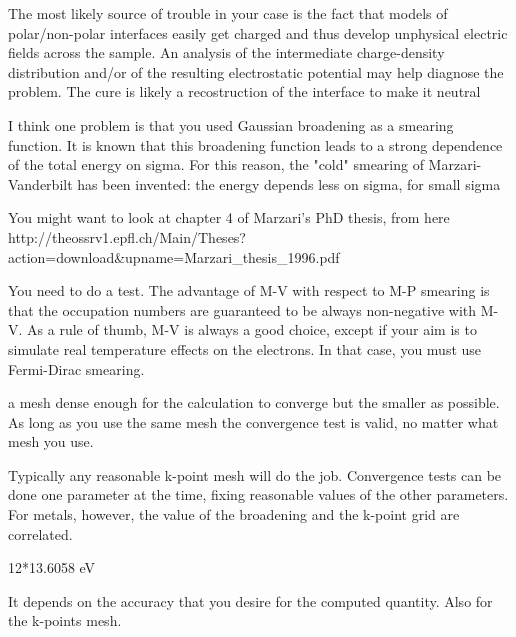   The most likely source of trouble in your case is the fact that models of polar/non-polar interfaces easily get charged and thus develop unphysical electric fields across the sample. An analysis of the intermediate charge-density distribution and/or of the resulting electrostatic potential may help  diagnose the problem. The cure is likely a recostruction of the interface to make it neutral

  I think one problem is that you used Gaussian broadening as a smearing function. It is known that this broadening function leads to a strong dependence of the total energy on sigma. For this reason, the "cold" smearing of Marzari-Vanderbilt has been invented: the energy depends less on sigma, for small sigma

  You might want to look at chapter 4 of Marzari's PhD thesis, from here http://theossrv1.epfl.ch/Main/Theses?action=download\&upname=Marzari\_thesis\_1996.pdf


  You need to do a test. The advantage of M-V with respect to M-P smearing is that the occupation numbers are guaranteed to be always non-negative with M-V. As a rule of thumb, M-V is always a good choice, except if your aim is to simulate real temperature effects on the electrons. In that case, you must use Fermi-Dirac smearing.



  a mesh dense enough for the calculation to  converge but the smaller as possible. As long as you use the same mesh the convergence test is valid, no  matter what mesh you use.

  Typically any reasonable k-point mesh will do the job. Convergence tests can be done one parameter at the time, fixing reasonable values of the other parameters. For metals, however, the value of the broadening and the k-point grid are correlated.


  12*13.6058 eV


  It depends on the accuracy that you desire for the computed quantity. Also for the k-points mesh.

